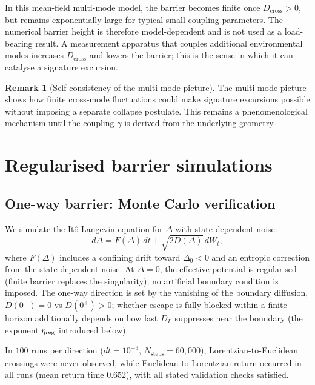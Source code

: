 \documentclass[11pt,a4paper]{article}
\theoremstyle{definition}
\newtheorem{remark}{Remark}
\begin{document}
In this mean-field multi-mode model, the barrier becomes finite once
$D_{\mathrm{cross}}>0$, but remains exponentially large for typical
small-coupling parameters. The numerical barrier height is therefore
model-dependent and is not used as a load-bearing result. A measurement
apparatus that couples additional environmental modes increases
$D_{\mathrm{cross}}$ and lowers the barrier; this is the sense in which it
can catalyse a signature excursion.

\begin{remark}[Self-consistency of the multi-mode picture]
The multi-mode picture shows how finite cross-mode fluctuations could
make signature excursions possible without imposing a separate collapse
postulate. This remains a phenomenological mechanism until the coupling
$\gamma$ is derived from the underlying geometry.
\end{remark}






\section{Regularised barrier simulations}\label{app:barrier_num}

\subsection{One-way barrier: Monte Carlo verification}

We simulate the It\^o Langevin equation for $\Delta$ with state-dependent noise:
\begin{equation}
d\Delta = F(\Delta)\,dt + \sqrt{2D(\Delta)}\,dW_t,
\end{equation}
where $F(\Delta)$ includes a confining drift toward $\Delta_0 < 0$ and an entropic correction from the state-dependent noise. At $\Delta = 0$, the effective potential is regularised (finite barrier replaces the singularity); no artificial boundary condition is imposed. The one-way direction is set by the vanishing of the boundary diffusion, $D(0^-) = 0$ vs $D(0^+) > 0$; whether escape is fully blocked within a finite horizon additionally depends on how fast $D_L$ suppresses near the boundary (the exponent $\eta_{\rm reg}$ introduced below).

\medskip\noindent In $100$ runs per direction ($dt = 10^{-3}$, $N_{\mathrm{steps}} = 60{,}000$), Lorentzian-to-Euclidean crossings were never observed, while Euclidean-to-Lorentzian return occurred in all runs (mean return time $0.652$), with all stated validation checks satisfied.
\end{document}
